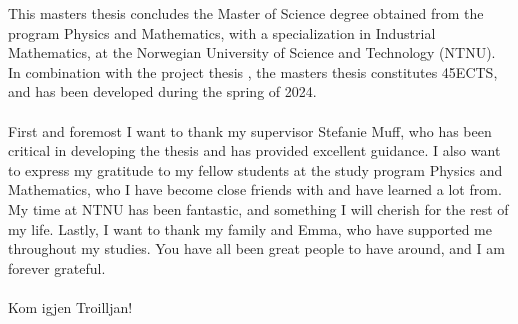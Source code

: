 This masters thesis concludes the Master of Science degree obtained from the program Physics and Mathematics, with a specialization in Industrial Mathematics, at the Norwegian University of Science and Technology (NTNU). In combination with the project thesis \citep{Arnstad:Relative_variable_importance_in_Bayesian_linear_mixed_models:2024}, the masters thesis constitutes 45ECTS, and has been developed during the spring of 2024.
\\
\\
First and foremost I want to thank my supervisor Stefanie Muff, who has been critical in developing the thesis and has provided excellent guidance. I also want to express my gratitude to my fellow students at the study program Physics and Mathematics, who I have become close friends with and have learned a lot from. My time at NTNU has been fantastic, and something I will cherish for the rest of my life. Lastly, I want to thank my family and Emma, who have supported me throughout my studies. You have all been great people to have around, and I am forever grateful. 
\\
\\
Kom igjen Troilljan!